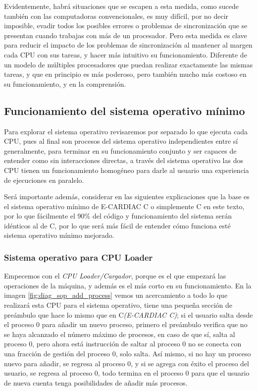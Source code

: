 \documentclass[letterpaper,12pt,oneside]{book}
\begin{document}
     		Evidentemente, habrá situaciones que se escapen a esta medida, como sucede también con las computadoras convencionales, es muy difícil, por
     		no decir imposible, evadir todos los posibles errores o problemas de sincronización que se presentan cuando trabajas con más de un procesador. Pero esta medida 
     		es clave para reducir el impacto de los problemas de sincronización al mantener al margen cada CPU con sus tareas, y hacer más intuitivo su funcionamiento.
     		Diferente de un modelo de múltiples procesadores que puedan realizar exactamente las mismas tareas, y que en principio es más poderoso, pero
     		también mucho más costoso en su funcionamiento, y en la comprensión.
	 	\clearpage
	 	\subsection{Funcionamiento del sistema operativo mínimo}
			
			Para explorar el sistema operativo revisaremos por separado lo que ejecuta cada CPU, pues al final son procesos
			del sistema operativo independientes entre sí generalmente, para terminar en su funcionamiento conjunto y ser capaces
			de entender como sin interacciones directas, a través del sistema operativo las dos CPU tienen un funcionamiento homogéneo para
			darle al usuario una experiencia de ejecuciones en paralelo.
			
			Será importante además, considerar en las siguientes explicaciones que la base es el sistema operativo mínimo de E-CARDIAC C o simplemente C en este texto, por
			lo que fácilmente el 90\% del código y funcionamiento del sistema serán idénticos al de C, por lo que será más fácil de entender cómo funciona esté
			sistema operativo mínimo mejorado.

	 	
		 	\subsubsection{ Sistema operativo para CPU Loader }
		 	
		 		Empecemos con el \textit{CPU Loader/Cargador}, porque es el que empezará las operaciones de la máquina, y además es el más corto en su funcionamiento. En
		 		la imagen \ref{fig:diag_sop_add_process} vemos un acercamiento a todo lo que realizará esta CPU para el sistema operativo, tiene una pequeña
		 		sección de preámbulo que hace lo mismo que en C\textit{(E-CARDIAC C)}; si el usuario salta desde el proceso 0 para añadir un nuevo proceso, primero el preámbulo verifica que no se haya alcanzado el número máximo de procesos, en caso de que sí, salta al proceso 0, pero ahora está 
		 		instrucción de saltar al proceso 0 no se conecta con una fracción de gestión del proceso 0, solo salta. Así mismo, si no hay 
		 		un proceso nuevo para añadir, se regresa al proceso 0, y si se agrega con éxito el proceso del usuario, se regresa al proceso 0, todo termina
		 		en el proceso 0 para que el usuario de nueva cuenta tenga posibilidades de añadir más procesos. 
     
\end{document}
